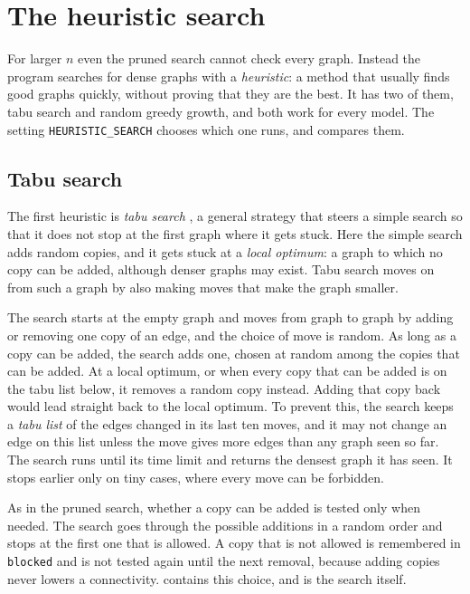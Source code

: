 \section{The heuristic search}\label{sec:heuristic}
For larger $n$ even the pruned search cannot check every graph.
Instead the program searches for dense graphs with a \emph{heuristic}: a method that usually finds good graphs quickly, without proving that they are the best.
It has two of them, tabu search and random greedy growth, and both work for every model.
The setting \texttt{HEURISTIC\_SEARCH} chooses which one runs, and  compares them.

\subsection{Tabu search}

The first heuristic is \emph{tabu search} \cite{Glover89}, a general strategy that steers a simple search so that it does not stop at the first graph where it gets stuck.
Here the simple search adds random copies, and it gets stuck at a \emph{local optimum}: a graph to which no copy can be added, although denser graphs may exist.
Tabu search moves on from such a graph by also making moves that make the graph smaller.

The search starts at the empty graph and moves from graph to graph by adding or removing one copy of an edge, and the choice of move is random.
As long as a copy can be added, the search adds one, chosen at random among the copies that can be added.
At a local optimum, or when every copy that can be added is on the tabu list below, it removes a random copy instead.
Adding that copy back would lead straight back to the local optimum.
To prevent this, the search keeps a \emph{tabu list} of the edges changed in its last ten moves, and it may not change an edge on this list unless the move gives more edges than any graph seen so far.
The search runs until its time limit and returns the densest graph it has seen. It stops earlier only on tiny cases, where every move can be forbidden.

As in the pruned search, whether a copy can be added is tested only when needed.
The search goes through the possible additions in a random order and stops at the first one that is allowed.
A copy that is not allowed is remembered in \texttt{blocked} and is not tested again until the next removal, because adding copies never lowers a connectivity.
 contains this choice, and  is the search itself.

